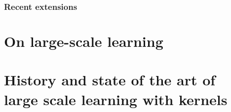 \subsubsection{Recent extensions}

\section{On large-scale learning}
\label{sec:on_large-scale_learning}

\section{History and state of the art of large scale learning with kernels}
\label{sec:history}

\chapterend
